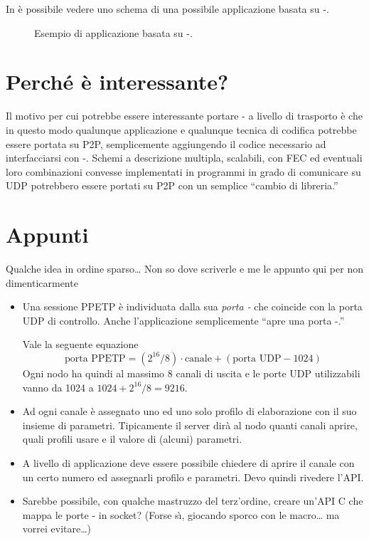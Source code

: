 \documentclass{rfc}
\begin{document}
%
In  \`e possibile vedere uno schema di una possibile
applicazione basata su \ppetp-.

\begin{figure}
\centerline{}
\caption{Esempio di applicazione basata su \ppetp-.
\label{fig:cpptp}}
\end{figure}
%

\section{Perch\'e \`e interessante?}
\label{sub:intro.0;driver}

Il motivo per cui potrebbe essere interessante portare \medusa- a
livello di trasporto \`e che in questo modo qualunque applicazione e
qualunque tecnica di codifica potrebbe essere portata su P2P,
semplicemente aggiungendo il codice necessario ad interfacciarsi con
\ppetp-. Schemi a descrizione multipla, scalabili, con FEC ed
eventuali loro combinazioni convesse implementati in programmi in
grado di comunicare su UDP potrebbero essere portati su P2P con un
semplice ``cambio di libreria.'' 

\section{Appunti}
\label{sect:intro.0;transport_layer}

Qualche idea in ordine sparso\ldots{} Non so dove scriverle e me le
appunto qui per non dimenticarmente

\begin{itemize}
\item
Una sessione PPETP \`e individuata dalla sua \emph{porta \ppetp-} 
che coincide con la porta UDP di controllo.  Anche l'applicazione
semplicemente ``apre una porta \ppetp-.''
\begin{commento}
Vale la seguente equazione
%
\begin{equation}
\label{eq:0;transport_layer}
\text{porta PPETP} = (2^{16}/8) \cdot \text{canale} + (\text{porta UDP}-1024)
\end{equation}
%
Ogni nodo ha quindi al massimo 8 canali di uscita e le porte UDP
utilizzabili vanno da 1024 a $1024 + 2^{16}/8 = 9216$.
\end{commento}
%
\item
Ad ogni canale \`e assegnato uno ed uno solo profilo di elaborazione
con il suo insieme di parametri.  Tipicamente il server dir\`a al nodo
quanti canali aprire, quali profili usare e il valore di (alcuni)
parametri. 
\item
A livello di applicazione deve essere possibile chiedere di aprire il
canale con un certo numero ed assegnarli profilo e parametri.  Devo
quindi rivedere l'API.
\item
Sarebbe possibile, con qualche mastruzzo del terz'ordine, creare
un'API C che mappa le porte \ppetp- in socket? (Forse s\`\i{},
giocando sporco con le macro\ldots{} ma vorrei evitare\ldots)
\end{itemize}
%
\end{document}
